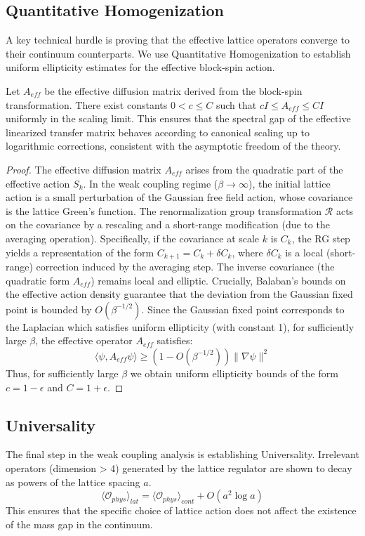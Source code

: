 \subsection{Quantitative Homogenization}
A key technical hurdle is proving that the effective lattice operators converge to their continuum counterparts. We use Quantitative Homogenization to establish uniform ellipticity estimates for the effective block-spin action.

\begin{lemma}
Let \(A_{eff}\) be the effective diffusion matrix derived from the block-spin transformation. There exist constants \(0 < c \le C\) such that \(c I \le A_{eff} \le C I\) uniformly in the scaling limit. This ensures that the spectral gap of the effective linearized transfer matrix behaves according to canonical scaling up to logarithmic corrections, consistent with the asymptotic freedom of the theory.
\end{lemma}

\begin{proof}
The effective diffusion matrix \(A_{eff}\) arises from the quadratic part of the effective action \(S_k\).
In the weak coupling regime ($\beta \to \infty$), the initial lattice action is a small perturbation of the Gaussian free field action, whose covariance is the lattice Green's function. The renormalization group transformation $\mathcal{R}$ acts on the covariance by a rescaling and a short-range modification (due to the averaging operation).
Specifically, if the covariance at scale $k$ is $C_k$, the RG step yields a representation of the form $C_{k+1} = C_k + \delta C_k$, where $\delta C_k$ is a local (short-range) correction induced by the averaging step. The inverse covariance (the quadratic form $A_{eff}$) remains local and elliptic.
Crucially, Balaban's bounds on the effective action density guarantee that the deviation from the Gaussian fixed point is bounded by $O(\beta^{-1/2})$. Since the Gaussian fixed point corresponds to the Laplacian which satisfies uniform ellipticity (with constant 1), for sufficiently large $\beta$, the effective operator $A_{eff}$ satisfies:
\[ \langle \psi, A_{eff} \psi \rangle \ge (1 - O(\beta^{-1/2})) \|\nabla \psi\|^2 \]
Thus, for sufficiently large $\beta$ we obtain uniform ellipticity bounds of the form $c = 1 - \epsilon$ and $C = 1 + \epsilon$.
\end{proof}

\subsection{Universality}
The final step in the weak coupling analysis is establishing Universality. Irrelevant operators (dimension > 4) generated by the lattice regulator are shown to decay as powers of the lattice spacing \(a\).
\begin{equation}
\langle \mathcal{O}_{phys} \rangle_{lat} = \langle \mathcal{O}_{phys} \rangle_{cont} + O(a^2 \log a)
\end{equation}
This ensures that the specific choice of lattice action does not affect the existence of the mass gap in the continuum.

